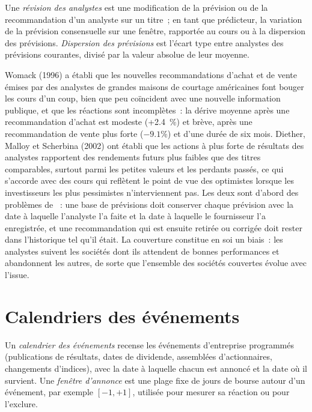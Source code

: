 \begin{definition}\label{def:rs:fundamental-analyst-and-event-features:revision}
Une \emph{révision des analystes} est une modification de la prévision ou de la recommandation d'un analyste sur un titre~; en tant que prédicteur, la
variation de la prévision consensuelle sur une fenêtre, rapportée au cours ou à la dispersion des prévisions. \emph{Dispersion
des prévisions} est l'écart type entre analystes des prévisions courantes, divisé par la valeur absolue de leur
moyenne.
\end{definition}

Womack (1996) a établi que les nouvelles recommandations d'achat et de vente émises par des analystes de grandes maisons de courtage américaines font bouger les cours d'un coup, bien que peu coïncident
avec une nouvelle information publique, et que les réactions sont incomplètes~: la dérive moyenne après une recommandation d'achat est modeste (+2.4~\%) et brève,
après une recommandation de vente plus forte ($-9.1\%$) et d'une durée de six mois. Diether, Malloy et Scherbina (2002) ont établi que les actions à plus forte  de résultats des analystes rapportent des rendements futurs plus faibles que des titres comparables, surtout parmi les petites valeurs et les perdants passés, ce qui s'accorde
avec des cours qui reflètent le point de vue des optimistes lorsque les investisseurs les plus pessimistes n'interviennent pas. Les deux sont d'abord des problèmes de ~: une
base de prévisions doit conserver chaque prévision avec la date à laquelle l'analyste l'a faite et la date à laquelle le fournisseur l'a enregistrée, et une recommandation qui
est ensuite retirée ou corrigée doit rester dans l'historique tel qu'il était. La couverture constitue en soi un biais~: les analystes suivent les sociétés dont ils attendent de bonnes
performances et abandonnent les autres, de sorte que l'ensemble des sociétés couvertes évolue avec l'issue.

\section{Calendriers des événements}

\begin{definition}\label{def:rs:fundamental-analyst-and-event-features:calendar}
Un \emph{calendrier des événements} recense les événements d'entreprise programmés (publications de résultats, dates de dividende, assemblées d'actionnaires,
changements d'indices), avec la date à laquelle chacun est annoncé et la date où il survient. Une \emph{fenêtre d'annonce} est une
plage fixe de jours de bourse autour d'un événement, par exemple $[-1, +1]$, utilisée pour mesurer sa réaction ou pour l'exclure.
\end{definition}

